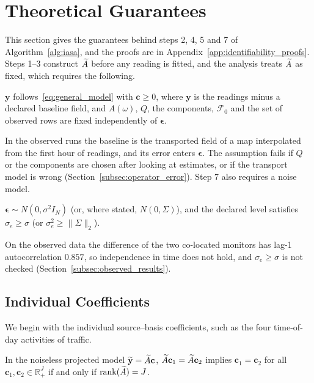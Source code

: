\section{Theoretical Guarantees}
\label{sec:identifiability_theory}

This section gives the guarantees behind steps 2, 4, 5 and 7 of
Algorithm~\ref{alg:iasa}, and the proofs are in Appendix~\ref{app:identifiability_proofs}.
Steps 1--3 construct \(\widetilde A\) before any reading is fitted, and the analysis treats
\(\widetilde A\) as fixed, which requires the following.

\begin{assumption}
\label{ass:model}
\(\mathbf y\) follows~\eqref{eq:general_model} with \(\mathbf c\ge0\), where \(\mathbf y\)
is the readings minus a declared baseline field, and \(A(\omega)\), \(Q\), the components,
\(\mathcal F_0\) and the set of observed rows are fixed independently of
\(\boldsymbol\epsilon\).
\end{assumption}

In the observed runs the baseline is the transported field of a map interpolated from
the first hour of readings, and its error enters \(\boldsymbol\epsilon\).  The assumption
fails if \(Q\) or the components are chosen after looking at estimates, or if the
transport model is wrong (Section~\ref{subsec:operator_error}).  Step 7 also requires a
noise model.

\begin{assumption}[Noise]
\label{ass:noise}
\(\boldsymbol\epsilon\sim N(0,\sigma^2I_N)\) (or, where stated, \(N(0,\Sigma)\)), and the
declared level satisfies \(\sigma_e\ge\sigma\) (or \(\sigma_e^2\ge\|\Sigma\|_2\)).
\end{assumption}

On the observed data the difference of the two co-located monitors has lag-1
autocorrelation \(0.857\), so independence in time does not hold, and
\(\sigma_e\ge\sigma\) is not checked (Section~\ref{subsec:observed_results}).

\subsection{Individual Coefficients}

We begin with the individual source--basis coefficients, such as the four time-of-day
activities of traffic.

\begin{proposition}
\label{prop:rank_identifiability}
In the noiseless projected model \(\widetilde{\mathbf y}=\widetilde A\mathbf c\), \(\widetilde A\mathbf c_1=\widetilde A\mathbf c_2\)
implies \(\mathbf c_1=\mathbf c_2\) for all \(\mathbf c_1,\mathbf c_2\in\mathbb R_+^J\)
if and only if \(\operatorname{rank}(\widetilde A)=J\).
\end{proposition}

